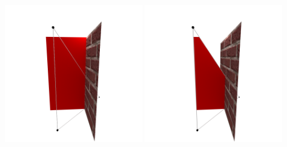 \documentclass[11pt]{beamer}
\begin{document}
\begin{frame}
    \includegraphics[width=0.45\textwidth]{Reflexion/5}
    \includegraphics[width=0.45\textwidth]{Reflexion/6}
\end{frame}
\end{document}
